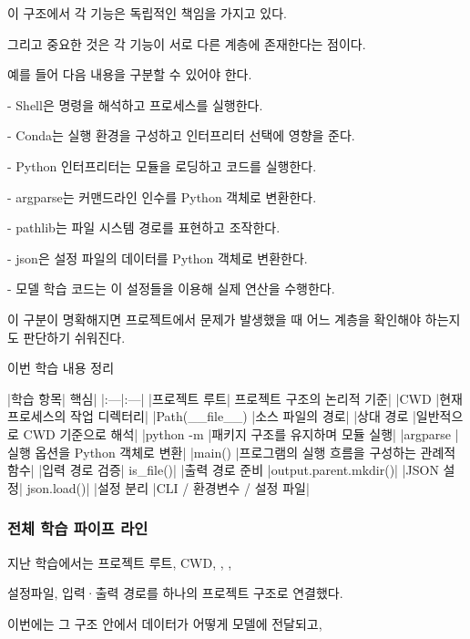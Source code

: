 이 구조에서 각 기능은 독립적인 책임을 가지고 있다.

그리고 중요한 것은 각 기능이 서로 다른 계층에 존재한다는 점이다.

예를 들어 다음 내용을 구분할 수 있어야 한다.

\begin{dhksmry}
- Shell은 명령을 해석하고 프로세스를 실행한다.

- Conda는 실행 환경을 구성하고 인터프리터 선택에 영향을 준다.

- Python 인터프리터는 모듈을 로딩하고 코드를 실행한다.

- argparse는 커맨드라인 인수를 Python 객체로 변환한다.

- pathlib는 파일 시스템 경로를 표현하고 조작한다.

- json은 설정 파일의 데이터를 Python 객체로 변환한다.

- 모델 학습 코드는 이 설정들을 이용해 실제 연산을 수행한다.
\end{dhksmry}

이 구분이 명확해지면 프로젝트에서 문제가 발생했을 때 어느 계층을 확인해야 하는지도 판단하기 쉬워진다.

\begin{dhknote}
\begin{dhksmry}[centered]
이번 학습 내용 정리
\end{dhksmry}
\end{dhknote}

\begin{dhktable}
|학습 항목|	핵심|
|:---|:---|
|프로젝트 루트|	프로젝트 구조의 논리적 기준|
|CWD	|현재 프로세스의 작업 디렉터리|
|Path(__file__)	|소스 파일의 경로|
|상대 경로	|일반적으로 CWD 기준으로 해석|
|python -m	|패키지 구조를 유지하며 모듈 실행|
|argparse	|실행 옵션을 Python 객체로 변환|
|main()	|프로그램의 실행 흐름을 구성하는 관례적 함수|
|입력 경로 검증|	is_file()|
|출력 경로 준비	|output.parent.mkdir()|
|JSON 설정|	json.load()|
|설정 분리	|CLI / 환경변수 / 설정 파일|
\end{dhktable}

\subsubsection{전체 학습 파이프 라인}

지난 학습에서는 프로젝트 루트, CWD, , ,

설정파일, 입력·출력 경로를 하나의 프로젝트 구조로 연결했다.

이번에는 그 구조 안에서 데이터가 어떻게 모델에 전달되고,

